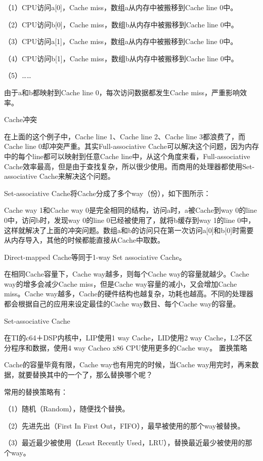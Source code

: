 \documentclass[12pt,UTF8]{ctexbook}
\begin{document}
（1）CPU访问a[0]，Cache miss，数组a从内存中被搬移到Cache line 0中。

（2）CPU访问b[0]，Cache miss，数组b从内存中被搬移到Cache line 0中。

（3）CPU访问a[1]，Cache miss，数组a从内存中被搬移到Cache line 0中。

（4）CPU访问b[1]，Cache miss，数组b从内存中被搬移到Cache line 0中。

（5）……

由于a和b都映射到Cache line 0，每次访问数据都发生Cache miss，严重影响效率。

Cache冲突

在上面的这个例子中，Cache line 1、Cache line 2、Cache line 3都浪费了，而Cache line 0却冲突严重。其实Full-associative Cache可以解决这个问题，因为内存中的每个line都可以映射到任意Cache line中，从这个角度来看，Full-associative Cache效率最高，但是由于查找复杂，所以很少使用。而商用的处理器都使用Set-associative Cache来解决这个问题。

Set-associative Cache将Cache分成了多个way（份），如下图所示：

Cache way 1和Cache way 0是完全相同的结构，访问a时，a被Cache到way 0的line 0中，访问b时，发现way 0的line 0已经被使用了，就将b缓存到way 1的line 0中，这样就解决了上面的冲突问题。数组a和b的访问只在第一次访问a[0]和b[0]时需要从内存导入，其他的时候都能直接从Cache中取数。

Direct-mapped Cache等同于1-way Set associative Cache。

在相同Cache容量下，Cache way越多，则每个Cache way的容量就越少。Cache way的增多会减少Cache miss，但是Cache way容量的减小，又会增加Cache miss。Cache way越多，Cache的硬件结构也越复杂，功耗也越高。不同的处理器都会根据自己的应用来设定最佳的Cache way数目、每个Cache way的容量。

Set-associative Cache

在TI的c64＋DSP内核中，LIP使用1 way Cache，LID使用2 way Cache，L2不区分程序和数据，使用4 way Cacheo x86 CPU使用更多的Cache way。
置换策略

Cache的容量毕竟有限，Cache way也有用完的时候，当Cache way用完时，再来数据，就要替换其中的一个了，那么替换哪个呢？

常用的替换策略有：

（1）随机（Random），随便找个替换。

（2）先进先出（First In First Out，FIFO），最早被使用的那个way被替换。

（3）最近最少被使用（Least Recently Used，LRU），替换最近最少被使用的那个way。
\end{document}
